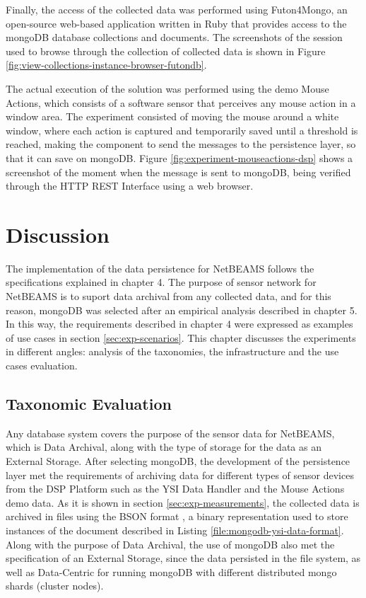 Finally, the access of the collected data was performed using Futon4Mongo,
an open-source web-based application written in Ruby that provides access to the
mongoDB database collections and documents. The screenshots of the session used
to browse through the collection of collected data is shown in Figure
\ref{fig:view-collections-instance-browser-futondb}.

The actual execution of the solution was performed using the demo Mouse
Actions, which consists of a software sensor that perceives any mouse action in
a window area. The experiment consisted of moving the mouse around a white
window, where each action is captured and temporarily saved until a threshold is
reached, making the component to send the messages to the persistence layer, so
that it can save on mongoDB. Figure \ref{fig:experiment-mouseactions-dsp} shows
a screenshot of the moment when the message is sent to mongoDB, being verified
through the HTTP REST Interface using a web browser.

\section{Discussion}

The implementation of the data persistence for NetBEAMS follows the
specifications explained in chapter 4. The purpose of sensor network for
NetBEAMS is to suport data archival from any collected data, and for this
reason, mongoDB was selected after an empirical analysis described in chapter
5. In this way, the requirements described in chapter 4 were expressed as
examples of use cases in section \ref{sec:exp-scenarios}. This chapter
discusses the experiments in different angles: analysis of the taxonomies, the
infrastructure and the use cases evaluation.

\subsection{Taxonomic Evaluation}

Any database system covers the purpose of the sensor data for NetBEAMS, which
is Data Archival, along with the type of storage for the data as an External
Storage. After selecting mongoDB, the development of the persistence layer met
the requirements of archiving data for different types of sensor devices from
the DSP Platform such as the YSI Data Handler and the Mouse Actions demo data.
As it is shown in section \ref{sec:exp-measurements}, the collected data is
archived in files using the BSON format \cite{bson}, a binary representation
used to store instances of the document described in Listing
\ref{file:mongodb-ysi-data-format}. Along with the purpose of Data Archival,
the use of mongoDB also met the specification of an External Storage, since the
data persisted in the file system, as well as Data-Centric for running mongoDB
with different  distributed mongo shards (cluster nodes).

